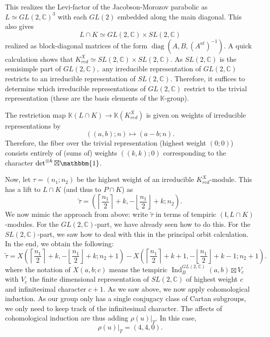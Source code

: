 \documentclass[letterpaper,twosided,11pt]{article}
\theoremstyle{plain}
\theoremstyle{definition}
\theoremstyle{remark}
\newcommand{\C}{\mathbb{C}}
\newcommand{\tensor}{\otimes}
\newcommand{\Ind}{\operatorname{Ind}}
\newcommand{\lie}[1]{\mathfrak{#1}}
\begin{document}
This realizes the Levi-factor of the Jacobson-Morozov parabolic as $ L\simeq
GL(2,\C)^3 $ with each $ GL(2) $ embedded along the main diagonal.  This
also gives
\[
    L\cap K\simeq GL(2,\C)\times SL(2,\C)
\]
realized as block-diagonal matrices of the form $
\operatorname{diag}
(A,B,(A^{at})^{-1}). $ A quick calculation shows that $ K^X_{red}\simeq
SL(2,\C)\times SL(2,\C) $.  As $ SL(2,\C) $ is the semisimple part of $
GL(2,\C), $ any irreducible representation of $ GL(2,\C) $ restricts to
an irreducible representation of $ SL(2,\C). $ Therefore, it suffices to
determine which irreducible representations of $ GL(2,\C) $ restrict to
the trivial representation (these are the basis elements of the $
\mathbb{K} $-group).

The restriction map $ \mathbb{K}(L\cap K)\to \mathbb{K}(K^X_{red}) $ is
given on weights of irreducible representations by
\[
    ((a,b); n)\mapsto (a-b;n).
\]
Therefore, the fiber over the trivial representation (highest weight $ (0;0)
$) consists entirely of (sums of) weights $ ((k,k);0) $ corresponding to the character $ \det^{\tensor
k}\boxtimes \mathbbm{1} $.

Now, let $ \tau=(n_1;n_2) $ be the highest weight of an irreducible $ K^X_
{red} $-module.  This has a lift to $ L\cap K $ (and thus to $ P\cap K $)
as
\[
    \tilde{\tau}=\left( \left\lceil \frac{n_1}{2} \right \rceil+k, -\left\lfloor
    \frac{n_1}{2} \right \rfloor+k; n_2\right).
\]
We now mimic the approach from above:  write $ \tilde{\tau} $ in terms
of tempiric $ (\lie{l},L\cap K) $-modules.  For the $ GL(2,\C) $-part,
we have already seen how to do this.  For the $ SL(2,\C) $-part, we saw
how to deal with this in the principal orbit calculation.  In the end,
we obtain the following:
\[
    \tilde{\tau}=X\left( \left\lceil \frac{n_1}{2} \right \rceil+k, -\left\lfloor
    \frac{n_1}{2} \right \rfloor+k; n_2+1\right)- X\left( \left\lceil
    \frac{n_1}{2} \right \rceil+k+1, -\left\lfloor \frac{n_1}{2} \right
    \rfloor+k-1; n_2+1\right).
\]
where the notation of $ X(a,b;c) $ means the tempiric $ \Ind_B^{GL(2,\C)}
(a,b)\boxtimes V_{c} $ with $ V_{c} $ the finite dimensional
representation of $ SL(2,\C) $ of highest weight $ c $ and infinitesimal
character $ c+1. $ As we saw above, we now apply cohomological
induction.  As our group only has a single conjugacy class of Cartan
subgroups, we only need to keep track of the infinitesimal character.
The affects of cohomological induction are thus adding $ \rho(u)|_T. $
In this case,
\[
    \rho(u)|_T=(4,4,0).
\]
\end{document}
